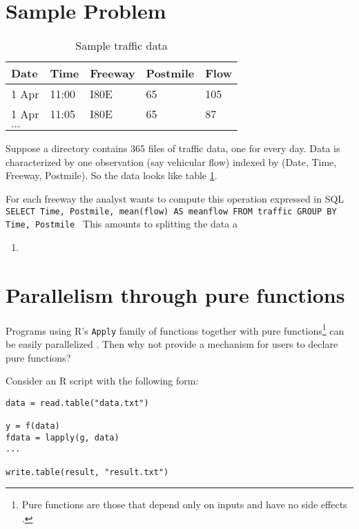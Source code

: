 \documentclass[12pt]{article}
\begin{document}
\section{Sample Problem}

\begin{table}
    \begin{tabular}{| l | l | l | l | l |}
    \hline
        Date & Time & Freeway & Postmile & Flow \\ \hline
        1 Apr & 11:00 & I80E & 65 & 105 \\ 
        1 Apr & 11:05 & I80E & 65 & 87 \\ 
        $\dots$ & & & & \\ \hline
    \end{tabular}
    \caption{Sample traffic data}
    \label{table:traffic}
\end{table}

Suppose a directory contains 365 files of traffic data, one for every day.
Data is characterized by one observation (say vehicular flow)
indexed by (Date, Time, Freeway, Postmile). So the data looks like table
\ref{table:traffic}.

For each freeway the analyst wants to compute this operation expressed in SQL
\texttt{
    SELECT Time, Postmile, mean(flow) AS meanflow FROM traffic GROUP BY Time, Postmile
}
This amounts to splitting the data a

\begin{enumerate}
    \item 
\end{enumerate}

\section{Parallelism through pure functions}

Programs using R's \texttt{Apply} family of functions together with pure
functions\footnote{Pure functions are those that depend only on inputs and
have no side effects \cite{wiki:purefunc}.} can be easily parallelized
\cite{bohringer2013dynamic}. Then why not provide a mechanism for users to
declare pure functions?

Consider an R script with the following form:
\begin{verbatim}
data = read.table("data.txt")

y = f(data)
fdata = lapply(g, data)
...

write.table(result, "result.txt")
\end{verbatim}
\end{document}
